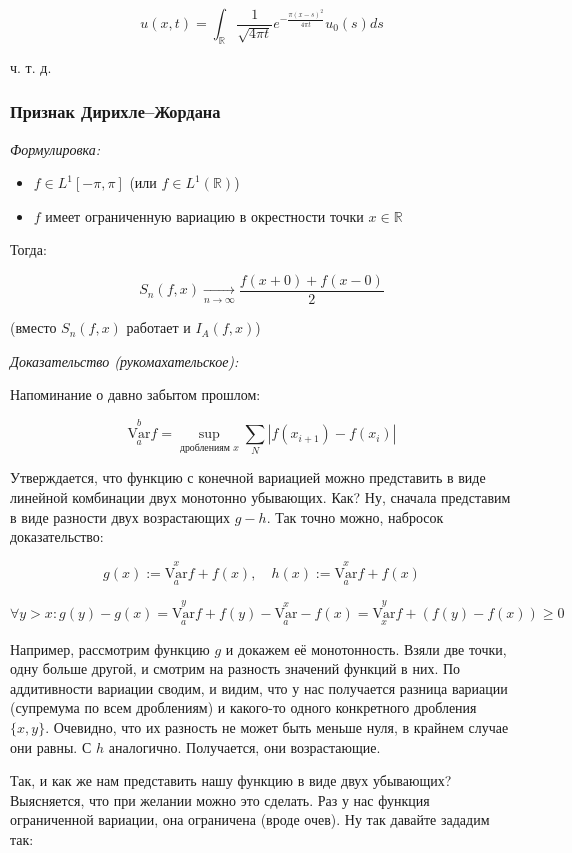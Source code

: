 \documentclass{article}
\def\goesto#1{\underset{#1}{\longrightarrow}}
\def\toinf#1{\goesto{#1 \rightarrow \infty}}
\def\ntoinf{\toinf{n}}
\def\Var#1#2{\overset{#2}{\underset{#1}{\text{Var}}}}
\begin{document}
\[u(x, t) = \int_{\mathbb{R}} \frac{1}{\sqrt{4 \pi t}} e^{-\frac{\pi (x - s)^2}{4 \pi t}} u_0(s)ds\]

ч. т. д. 

\subsubsection{Признак Дирихле--Жордана}
\textit{Формулировка:}

\begin{itemize}
    \item $f \in L^1[-\pi, \pi]$ (или $f \in L^1(\mathbb{R})$)
    \item $f$ имеет ограниченную вариацию в окрестности точки $x \in \mathbb{R}$
\end{itemize}

Тогда:

\[S_n(f, x) \ntoinf \frac{f(x + 0) + f(x - 0)}{2}\]

(вместо $S_n(f, x)$ работает и $I_A(f, x)$)

\textit{Доказательство (рукомахательское):}

Напоминание о давно забытом прошлом:

\[\Var{a}{b} f  = \sup_{\text{дроблениям } x} \sum_{N} |f(x_{i + 1}) - f(x_i)|\]

Утверждается, что функцию с конечной вариацией можно представить в виде линейной комбинации двух монотонно убывающих. Как? Ну, сначала представим в виде разности двух возрастающих $g - h$. Так точно можно, набросок доказательство:

\[g(x) := \Var{a}{x} f + f(x), \quad h(x) := \Var{a}{x} f + f(x)\]

\[\forall y > x : g(y) - g(x) = \Var{a}{y} f + f(y) - \Var{a}{x} - f(x) = \Var{x}{y} f + (f(y) - f(x)) \ge 0\]

Например, рассмотрим функцию $g$ и докажем её монотонность. Взяли две точки, одну больше другой, и смотрим на разность значений функций в них. По аддитивности вариации сводим, и видим, что у нас получается разница вариации (супремума по всем дроблениям) и какого-то одного конкретного дробления $\{x, y\}$. Очевидно, что их разность не может быть меньше нуля, в крайнем случае они равны. С $h$ аналогично. Получается, они возрастающие.

Так, и как же нам представить нашу функцию в виде двух убывающих? Выясняется, что при желании можно это сделать. Раз у нас функция ограниченной вариации, она ограничена (вроде очев). Ну так давайте зададим так:
\end{document}
